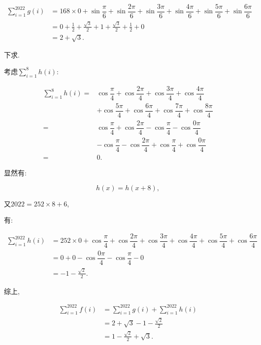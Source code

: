 \documentclass[8pt]{article}
\begin{document}
				\begin{align*}
				\sum_{i=1}^{2022} g(i) &= 168 \times 0 + \sin \dfrac {\pi}{6} + \sin \dfrac{2 \pi}{6} + \sin \dfrac{3 \pi}{6} + \sin \dfrac{4 \pi}{6} + \sin \dfrac{5 \pi}{6} + \sin \dfrac{6 \pi}{6}\\
				&= 0 + \frac{1}{2} + \frac{\sqrt{3}}{2} + 1 + \frac{\sqrt{3}}{2} + \frac{1}{2} + 0\\
				&= 2 + \sqrt{3}.
				\end{align*}

				下求.

				考虑$\displaystyle \sum_{i=1}^{8} h(i)$:	

				\begin{align*}
				\sum_{i=1}^{8} h(i) = & \cos \dfrac {\pi}{4} + \cos \dfrac{2 \pi}{4} + \cos \dfrac{3 \pi}{4} + \cos \dfrac{4 \pi}{4}\\
				& + \cos \dfrac{5 \pi}{4} + \cos \dfrac{6 \pi}{4} + \cos \dfrac{7 \pi}{4} + \cos \dfrac{8 \pi}{4}\\
				= & \cos \dfrac {\pi}{4} + \cos \dfrac{2 \pi}{4} - \cos \dfrac{\pi}{4} - \cos \dfrac{0 \pi}{4}\\
				& - \cos \dfrac{\pi}{4} - \cos \dfrac{2 \pi}{4} + \cos \dfrac{\pi}{4} + \cos \dfrac{0 \pi}{4}\\
				= & 0.
				\end{align*}

				显然有:

				$$h(x)=h(x+8),$$

				又$2022=252 \times 8 + 6$,

				有:

				\begin{align*}
				\sum_{i=1}^{2022} h(i) &= 252 \times 0 + \cos \dfrac {\pi}{4} + \cos \dfrac{2 \pi}{4} + \cos \dfrac{3 \pi}{4} + \cos \dfrac{4 \pi}{4} + \cos \dfrac{5 \pi}{4} + \cos \dfrac{6 \pi}{4}\\
				&= 0 + 0 - \cos \dfrac{0\pi}{4} - \cos \dfrac{\pi}{4} - 0\\
				&= -1 -\frac{\sqrt{2}}{2}.
				\end{align*}

				综上,

				\begin{align*}
				\sum_{i=1}^{2022} f(i) &= \sum_{i=1}^{2022} g(i) + \sum_{i=1}^{2022} h(i)\\
				&= 2 + \sqrt{3} - 1 - \frac{\sqrt{2}}{2}\\
				&= 1 - \frac{\sqrt{2}}{2} + \sqrt{3}.
				\end{align*}
\end{document}
